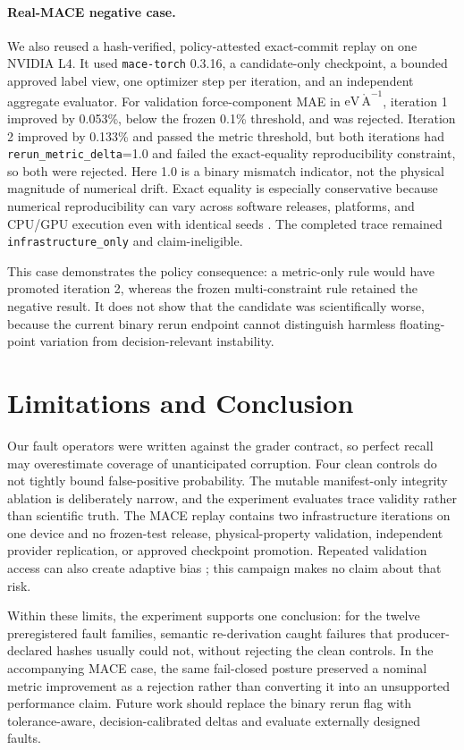\documentclass{article}
\begin{document}
\paragraph{Real-MACE negative case.}
We also reused a hash-verified, policy-attested exact-commit replay on one NVIDIA L4. It used \texttt{mace-torch} 0.3.16, a candidate-only checkpoint, a bounded approved label view, one optimizer step per iteration, and an independent aggregate evaluator. For validation force-component MAE in $\mathrm{eV\,\mathring{A}^{-1}}$, iteration 1 improved by 0.053\%, below the frozen 0.1\% threshold, and was rejected. Iteration 2 improved by 0.133\% and passed the metric threshold, but both iterations had \texttt{rerun\_metric\_delta}=1.0 and failed the exact-equality reproducibility constraint, so both were rejected. Here 1.0 is a binary mismatch indicator, not the physical magnitude of numerical drift. Exact equality is especially conservative because numerical reproducibility can vary across software releases, platforms, and CPU/GPU execution even with identical seeds \cite{pytorch2026reproducibility}. The completed trace remained \texttt{infrastructure\_only} and claim-ineligible.

This case demonstrates the policy consequence: a metric-only rule would have promoted iteration 2, whereas the frozen multi-constraint rule retained the negative result. It does not show that the candidate was scientifically worse, because the current binary rerun endpoint cannot distinguish harmless floating-point variation from decision-relevant instability.

\section{Limitations and Conclusion}

Our fault operators were written against the grader contract, so perfect recall may overestimate coverage of unanticipated corruption. Four clean controls do not tightly bound false-positive probability. The mutable manifest-only integrity ablation is deliberately narrow, and the experiment evaluates trace validity rather than scientific truth. The MACE replay contains two infrastructure iterations on one device and no frozen-test release, physical-property validation, independent provider replication, or approved checkpoint promotion. Repeated validation access can also create adaptive bias \cite{dwork2015holdout}; this campaign makes no claim about that risk.

Within these limits, the experiment supports one conclusion: for the twelve preregistered fault families, semantic re-derivation caught failures that producer-declared hashes usually could not, without rejecting the clean controls. In the accompanying MACE case, the same fail-closed posture preserved a nominal metric improvement as a rejection rather than converting it into an unsupported performance claim. Future work should replace the binary rerun flag with tolerance-aware, decision-calibrated deltas and evaluate externally designed faults.



\end{document}
